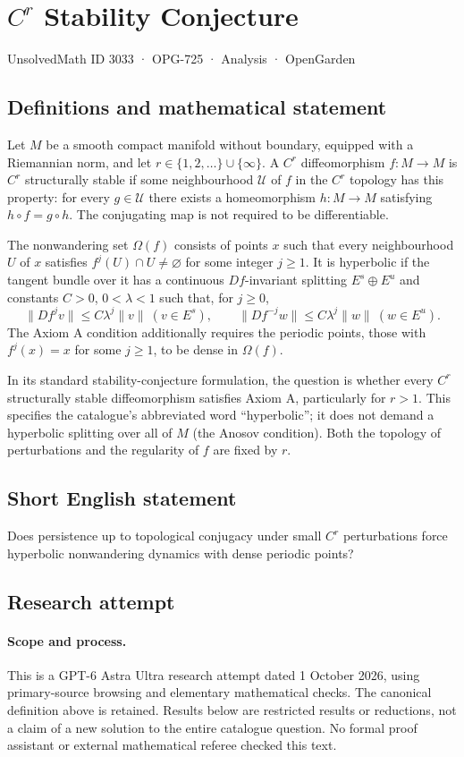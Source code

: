 \documentclass[11pt,a4paper]{article}
\begin{document}
\section*{$C^r$ Stability Conjecture}\label{3033}
{\small UnsolvedMath ID 3033 · OPG-725 · Analysis · OpenGarden}
\subsection{Definitions and mathematical statement}
Let $M$ be a smooth compact manifold without boundary, equipped with a
Riemannian norm, and let $r\in\{1,2,\ldots\}\cup\{\infty\}$.
A $C^r$ diffeomorphism $f:M\to M$ is $C^r$ structurally stable if some
neighbourhood $\mathcal U$ of $f$ in the $C^r$ topology has this property:
for every $g\in\mathcal U$ there exists a homeomorphism $h:M\to M$ satisfying
$h\circ f=g\circ h$. The conjugating map is not required to be differentiable.

The nonwandering set $\Omega(f)$ consists of points $x$ such that every
neighbourhood $U$ of $x$ satisfies $f^j(U)\cap U\ne\varnothing$ for some
integer $j\ge1$. It is hyperbolic if the tangent bundle over it has a continuous
$Df$-invariant splitting $E^s\oplus E^u$ and constants $C>0$, $0<\lambda<1$
such that, for $j\ge0$,
\[
 \|Df^j v\|\le C\lambda^j\|v\|\ (v\in E^s),\qquad
 \|Df^{-j}w\|\le C\lambda^j\|w\|\ (w\in E^u).
\]
The Axiom A condition additionally requires the periodic points, those with
$f^j(x)=x$ for some $j\ge1$, to be dense in $\Omega(f)$.

In its standard stability-conjecture formulation, the question is whether
every $C^r$ structurally stable diffeomorphism satisfies Axiom A, particularly
for $r>1$. This specifies the catalogue's abbreviated word ``hyperbolic'';
it does not demand a hyperbolic splitting over all of $M$ (the Anosov
condition). Both the topology of perturbations and the regularity of $f$
are fixed by $r$.
\subsection{Short English statement}
Does persistence up to topological conjugacy under small $C^r$ perturbations force hyperbolic nonwandering dynamics with dense periodic points?
\subsection{Research attempt}
\paragraph{Scope and process.}
This is a GPT-6 Astra Ultra research attempt dated 1 October 2026, using
primary-source browsing and elementary mathematical checks. The canonical
definition above is retained. Results below are restricted results or
reductions, not a claim of a new solution to the entire catalogue question.
No formal proof assistant or external mathematical referee checked this text.
\end{document}
